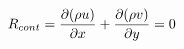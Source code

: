 \documentclass[preview]{standalone}
\begin{document}
\begin{align*}
\special{dvisvgm:raw <g id='unique000'>}R_{cont} = \frac{\partial (\rho u)}{\partial x} + \frac{\partial (\rho v)}{\partial y} = 0\special{dvisvgm:raw </g>}
\end{align*}
\end{document}
